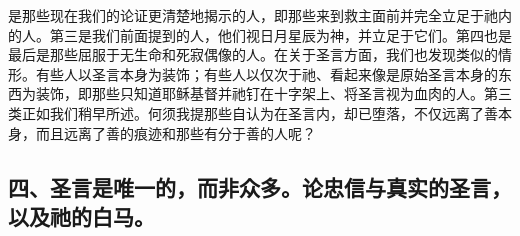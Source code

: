 是那些现在我们的论证更清楚地揭示的人，即那些来到救主面前并完全立足于祂内的人。第三是我们前面提到的人，他们视日月星辰为神，并立足于它们。第四也是最后是那些屈服于无生命和死寂偶像的人。在关于圣言方面，我们也发现类似的情形。有些人以圣言本身为装饰；有些人以仅次于祂、看起来像是原始圣言本身的东西为装饰，即那些只知道耶稣基督并祂钉在十字架上、将圣言视为血肉的人。第三类正如我们稍早所述。何须我提那些自认为在圣言内，却已堕落，不仅远离了善本身，而且远离了善的痕迹和那些有分于善的人呢？\par


\subsection{四、圣言是唯一的，而非众多。论忠信与真实的圣言，以及祂的白马。}

